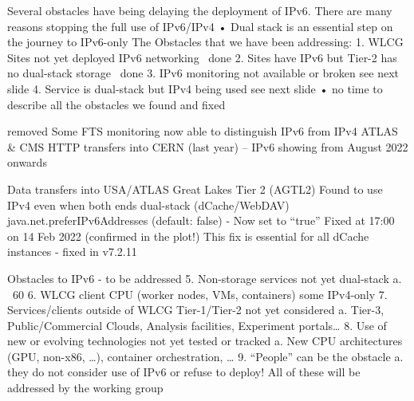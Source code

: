 
Several obstacles have being delaying the deployment of IPv6. 
There are many reasons stopping the full use of IPv6/IPv4
• Dual stack is an essential step on the journey to IPv6-only
The Obstacles that we have been addressing:
1. WLCG Sites not yet deployed IPv6 networking ~done
2. Sites have IPv6 but Tier-2 has no dual-stack storage ~done
3. IPv6 monitoring not available or broken see next slide
4. Service is dual-stack but IPv4 being used see next slide
• no time to describe all the obstacles we found and fixed


removed
Some FTS monitoring now able to
distinguish IPv6 from IPv4
ATLAS & CMS HTTP transfers into CERN (last year)
– IPv6 showing from August 2022 onwards

Data transfers into USA/ATLAS Great Lakes Tier 2 (AGTL2)
Found to use IPv4 even when both ends dual-stack (dCache/WebDAV)
java.net.preferIPv6Addresses (default: false) - Now set to “true”
Fixed at 17:00 on 14 Feb 2022 (confirmed in the plot!)
This fix is essential for all dCache instances - fixed in v7.2.11

Obstacles to IPv6 - to be addressed
5. Non-storage services not yet dual-stack
a. ~60%
6. WLCG client CPU (worker nodes, VMs, containers) some IPv4-only
7. Services/clients outside of WLCG Tier-1/Tier-2 not yet considered
a. Tier-3, Public/Commercial Clouds, Analysis facilities, Experiment portals…
8. Use of new or evolving technologies not yet tested or tracked
a. New CPU architectures (GPU, non-x86, …), container orchestration, …
9. “People” can be the obstacle
a. they do not consider use of IPv6 or refuse to deploy!
All of these will be addressed by the working group

